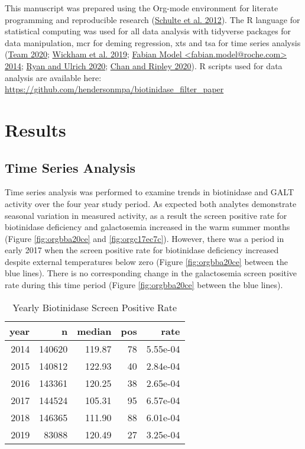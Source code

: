 \documentclass[review]{elsarticle}
\begin{document}
This manuscript was prepared using the Org-mode environment for
literate programming and reproducible research (\hyperlink{citeproc_bib_item_5}{Schulte et al. 2012}). The R language for statistical computing was used
for all data analysis with tidyverse packages for
data manipulation, mcr for deming regression, xts and tsa for time
series analysis (\hyperlink{citeproc_bib_item_7}{Team 2020}; \hyperlink{citeproc_bib_item_10}{Wickham et al. 2019}; \hyperlink{citeproc_bib_item_2}{Fabian Model <fabian.model@roche.com> 2014}; \hyperlink{citeproc_bib_item_4}{Ryan and Ulrich 2020}; \hyperlink{citeproc_bib_item_1}{Chan and Ripley 2020}). R scripts
used for data analysis are available here:
\url{https://github.com/hendersonmpa/biotinidase\_filter\_paper}

\section*{Results}
\label{sec:orge910167}
\subsection*{Time Series Analysis}
\label{sec:org0f1792a}
Time series analysis was performed to examine trends in biotinidase
and GALT activity over the four year study period. As expected both
analytes demonstrate seasonal variation in measured activity, as a
result the screen positive rate for biotinidase deficiency and
galactosemia increased in the warm summer months (Figure \ref{fig:orgbba20ce}
and \ref{fig:orgc17ec7c}). However, there was a period in early 2017 when the
screen positive rate for biotinidase deficiency increased despite
external temperatures below zero (Figure \ref{fig:orgbba20ce} between the blue
lines). There is no corresponding change in the galactosemia screen
positive rate during this time period (Figure \ref{fig:orgbba20ce} between the
blue lines).

\begin{table}[ht]
\centering
\begin{tabular}{rrrrr}
  \hline
year & n & median & pos & rate \\ 
  \hline
2014 & 140620 & 119.87 &  78 & 5.55e-04 \\ 
  2015 & 140812 & 122.93 &  40 & 2.84e-04 \\ 
  2016 & 143361 & 120.25 &  38 & 2.65e-04 \\ 
  2017 & 144524 & 105.31 &  95 & 6.57e-04 \\ 
  2018 & 146365 & 111.90 &  88 & 6.01e-04 \\ 
  2019 & 83088 & 120.49 &  27 & 3.25e-04 \\ 
   \hline
\end{tabular}
\caption{Yearly Biotinidase Screen Positive Rate} 
\label{tab:biot_year}
\end{table}
\end{document}

